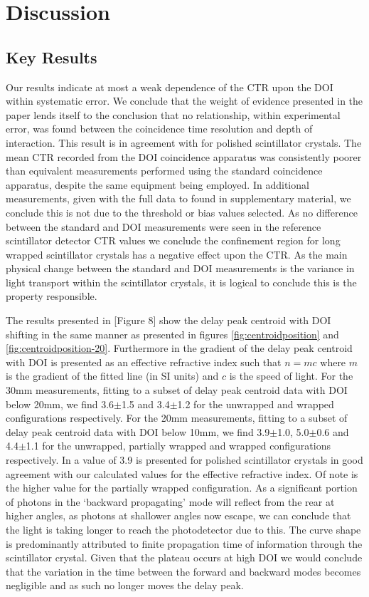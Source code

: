 \section{Discussion}
\label{sec:discussion}
\subsection{Key Results}
Our results indicate at most a weak dependence of the CTR upon the DOI within systematic error. We conclude that the weight of evidence presented in the paper lends itself to the conclusion that no relationship, within experimental error, was found between the coincidence time resolution and depth of interaction. This result is in agreement with \cite{Bircher_Shao_2012} for polished scintillator crystals. The mean CTR recorded from the DOI coincidence apparatus was consistently poorer than equivalent measurements performed using the standard coincidence apparatus, despite the same equipment being employed. In additional measurements, given with the full data to found in supplementary material, we conclude this is not due to the threshold or bias values selected. As no difference between the standard and DOI measurements were seen in the reference scintillator detector CTR values we conclude the confinement region for long wrapped scintillator crystals has a negative effect upon the CTR. As the main physical change between the standard and DOI measurements is the variance in light transport within the scintillator crystals, it is logical to conclude this is the property responsible.

The results presented in [Figure 8]\cite{Moses_Derenzo_1999} show the delay peak centroid with DOI shifting in the same manner as presented in figures \ref{fig:centroidposition} and \ref{fig:centroidposition-20}. Furthermore in \cite{Moses_Derenzo_1999} the gradient of  the delay peak centroid with DOI is presented as an effective refractive index such that $n=mc$ where $m$ is the gradient of the fitted line (in SI units) and $c$ is the speed of light. For the 30mm measurements, fitting to a subset of delay peak centroid data with DOI below 20mm, we find 3.6$\pm$1.5 and 3.4$\pm$1.2 for the unwrapped and wrapped configurations respectively.  For the 20mm measurements, fitting to a subset of delay peak centroid data with DOI below 10mm, we find 3.9$\pm$1.0, 5.0$\pm$0.6 and 4.4$\pm$1.1 for the unwrapped, partially wrapped and wrapped configurations respectively. In \cite{Moses_Derenzo_1999} a value of 3.9 is presented for polished scintillator crystals in good agreement with our calculated values for the effective refractive index. Of note is the higher value for the partially wrapped configuration. As a significant portion of photons in the `backward propagating' mode will reflect from the rear at higher angles, as photons at shallower angles now escape, we can conclude that the light is taking longer to reach the photodetector due to this. The curve shape is predominantly attributed to finite propagation time of information through the scintillator crystal. Given that the plateau occurs at high DOI we would conclude that the variation in the time between the forward and backward modes becomes negligible and as such no longer moves the delay peak.

